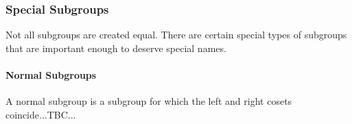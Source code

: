 





\subsubsection{Special Subgroups}
Not all subgroups are created equal. There are certain special types of subgroups that are important enough to deserve special names.

\paragraph{Normal Subgroups} A normal subgroup is a subgroup for which the left and right cosets coincide...TBC...

